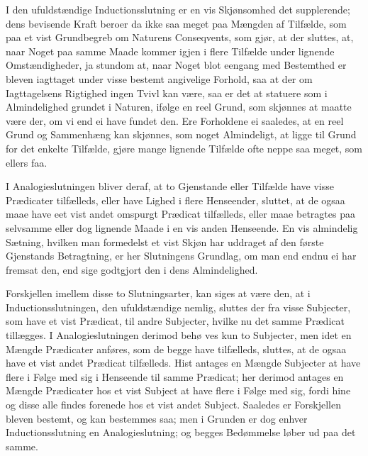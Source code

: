 \documentclass[12pt]{book}
\def\textit#1{#1}%
\newcommand{\opage}[1]{\marginnote{\footnotesize\textit{[#1]}}}
\begin{document}
I den ufuldstændige Inductionsslutning er en vis Skjønsomhed det supplerende;
dens bevisende Kraft beroer da ikke saa meget paa Mængden af Tilfælde, som paa
et vist Grundbegreb om Naturens Conseqvents, som gjør, at der sluttes, at, naar
Noget paa samme Maade
\opage{353} kommer igjen i flere Tilfælde under lignende Omstændigheder, ja stundom at, naar
Noget blot eengang med Bestemthed er bleven iagttaget under visse bestemt
angivelige Forhold, saa at der om Iagttagelsens Rigtighed ingen Tvivl kan være,
saa er det at statuere som i Almindelighed grundet i Naturen, ifølge en reel
Grund, som skjønnes at maatte være der, om vi end ei have fundet den. Ere
Forholdene ei saaledes, at en reel Grund og Sammenhæng kan skjønnes, som noget
Almindeligt, at ligge til Grund for det enkelte Tilfælde, gjøre mange lignende
Tilfælde ofte neppe saa meget, som ellers faa.

I Analogieslutningen bliver deraf, at to Gjenstande eller Tilfælde have visse
Prædicater tilfælleds, eller have Lighed i flere Henseender, sluttet, at de
ogsaa maae have eet vist andet omspurgt Prædicat tilfælleds, eller maae
betragtes paa selvsamme eller dog lignende Maade i en vis anden Henseende. En
vis almindelig Sætning, hvilken man formedelst et vist Skjøn har uddraget af den
første Gjenstands Betragtning, er her Slutningens Grundlag, om man end endnu ei
har fremsat den, end sige godtgjort den i dens Almindelighed.

Forskjellen imellem disse to Slutningsarter, kan siges at være den, at i
Inductionsslutningen, den ufuldstændige nemlig, sluttes der fra visse Subjecter,
som have et vist Prædicat, til andre Subjecter, hvilke nu det samme Prædicat
tillægges. I Analogieslutningen derimod behø%
\opage{354}ves kun to Subjecter, men idet en Mængde Prædicater anføres, som de begge have
tilfælleds, sluttes, at de ogsaa have et vist andet Prædicat tilfælleds. Hist
antages en Mængde Subjecter at have flere i Følge med sig i Henseende til samme
Prædicat; her derimod antages en Mængde Prædicater hos et vist Subject at have
flere i Følge med sig, fordi hine og disse alle findes forenede hos et vist
andet Subject. Saaledes er Forskjellen bleven bestemt, og kan bestemmes saa; men
i Grunden er dog enhver Inductionsslutning en Analogieslutning; og begges
Bedømmelse løber ud paa det samme.
\end{document}

